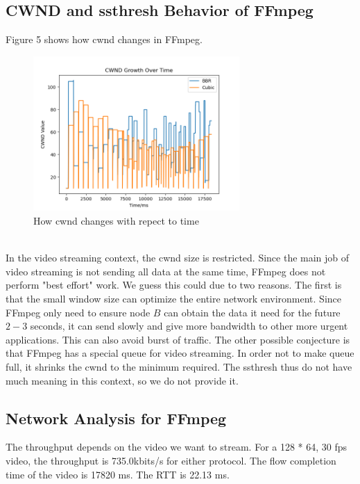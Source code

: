 \documentclass{article}
\begin{document}
\subsection{CWND and ssthresh Behavior of FFmpeg}
Figure 5 shows how cwnd changes in FFmpeg.
\begin{figure}[h]
    \centering
    \includegraphics[width=0.7\textwidth]{../figure/video_cwnd.png}
    \caption{How cwnd changes with repect to time}
    \label{fig:fig5}
\end{figure}
\\[6pt]
In the video streaming context, the cwnd size is restricted. Since the main job of video streaming is not sending all data at the same time, FFmpeg does not perform "best effort" work. We guess this could due to two reasons. The first is that the small window size can optimize the entire network environment.
Since FFmpeg only need to ensure node $B$ can obtain the data it need for the future $2-3$ seconds, it can send slowly and give more bandwidth to other more urgent applications. This can also avoid burst of traffic. The other possible conjecture is that FFmpeg has a special queue for video streaming. In order
not to make queue full, it shrinks the cwnd to the minimum required. The ssthresh thus do not have much meaning in this context, so we do not provide it.
\subsection{Network Analysis for FFmpeg}
The throughput depends on the video we want to stream. For a 128 * 64, 30 fps video, the throughput is 735.0kbits/s for either protocol. The flow completion time of the video is 17820 ms. The RTT is 22.13 ms.
\end{document}
